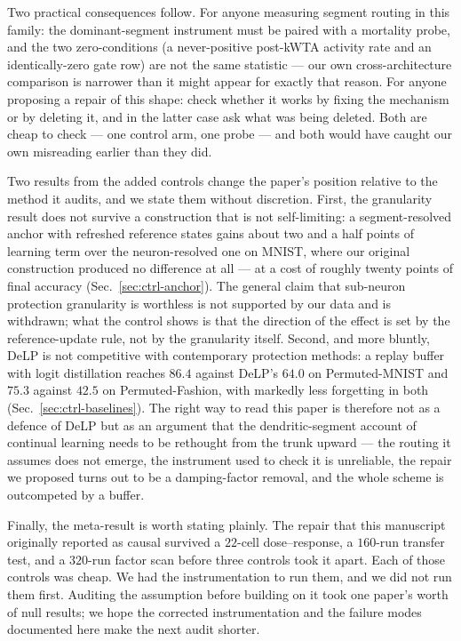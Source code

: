 \documentclass[10pt]{article}
\begin{document}
Two practical consequences follow. For anyone measuring segment routing in
this family: the dominant-segment instrument must be paired with a mortality
probe, and the two zero-conditions (a never-positive post-kWTA activity rate
and an identically-zero gate row) are not the same statistic --- our own
cross-architecture comparison is narrower than it might appear for exactly
that reason. For anyone proposing a repair of this shape: check whether it
works by fixing the mechanism or by deleting it, and in the latter case ask
what was being deleted. Both are cheap to check --- one control arm, one
probe --- and both would have caught our own misreading earlier than they
did.

Two results from the added controls change the paper's
position relative to the method it audits, and we state them without
discretion. First, the granularity result does not survive a
construction that is not self-limiting: a segment-resolved anchor with
refreshed reference states gains about two and a half points of learning term over
the neuron-resolved one on MNIST, where our original construction
produced no difference at all --- at a cost of roughly twenty points of
final accuracy (Sec.~\ref{sec:ctrl-anchor}). The general claim that
sub-neuron protection granularity is worthless is not supported by our
data and is withdrawn; what the control shows is that the direction of
the effect is set by the reference-update rule, not by the granularity
itself. Second, and more bluntly, DeLP is not competitive with
contemporary protection methods: a replay buffer with logit distillation
reaches $86.4$ against DeLP's $64.0$ on Permuted-MNIST and $75.3$
against $42.5$ on Permuted-Fashion, with markedly less forgetting in
both (Sec.~\ref{sec:ctrl-baselines}). The right way to read this paper is
therefore not as a defence of DeLP but as an argument that the
dendritic-segment account of continual learning needs to be rethought
from the trunk upward --- the routing it assumes does not emerge, the
instrument used to check it is unreliable, the repair we proposed turns
out to be a damping-factor removal, and the whole scheme is outcompeted
by a buffer.

Finally, the meta-result is worth stating plainly. The repair that this
manuscript originally reported as causal survived a $22$-cell
dose--response, a $160$-run transfer test, and a $320$-run factor scan
before three controls took it apart. Each of those controls was cheap. We
had the instrumentation to run them, and we did not run them first. Auditing
the assumption before building on it took one paper's worth of null results;
we hope the corrected instrumentation and the failure modes documented here
make the next audit shorter.
\end{document}
